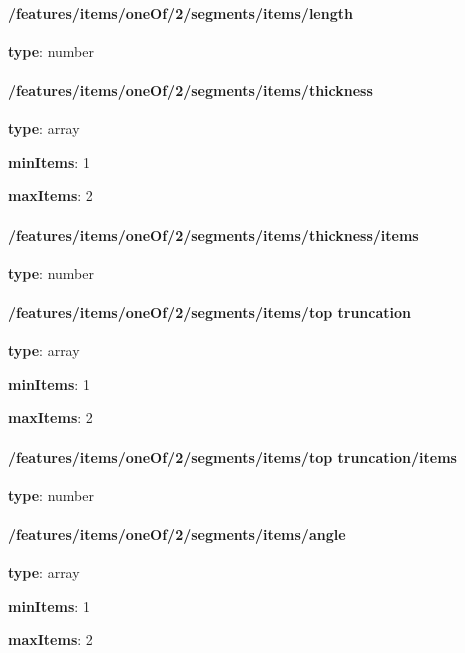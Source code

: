 \paragraph{/features/items/oneOf/2/segments/items/length} \begin{itemized}
\item {\bf type}: number
\end{itemized}\paragraph{/features/items/oneOf/2/segments/items/thickness} \begin{itemized}
\item {\bf type}: array
\item {\bf minItems}: 1
\item {\bf maxItems}: 2
\paragraph{/features/items/oneOf/2/segments/items/thickness/items} \begin{itemized}
\item {\bf type}: number
\end{itemized}\end{itemized}\paragraph{/features/items/oneOf/2/segments/items/top truncation} \begin{itemized}
\item {\bf type}: array
\item {\bf minItems}: 1
\item {\bf maxItems}: 2
\paragraph{/features/items/oneOf/2/segments/items/top truncation/items} \begin{itemized}
\item {\bf type}: number
\end{itemized}\end{itemized}\paragraph{/features/items/oneOf/2/segments/items/angle} \begin{itemized}
\item {\bf type}: array
\item {\bf minItems}: 1
\item {\bf maxItems}: 2

\end{itemized}
